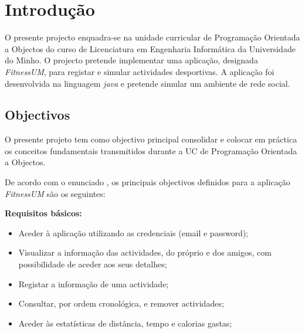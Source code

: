 \documentclass[a4paper,10pt]{report}
\begin{document}

\newpage
\phantom{placeholder} %
\thispagestyle{empty} %
\tableofcontents
\phantom{placeholder} %
\thispagestyle{empty} %
\newpage
\phantom{placeholder} %
\thispagestyle{empty} %
\pagestyle{fancy}
\setlength{\headheight}{15.2pt}
\fancyhf{} %
\fancyfoot[LE,RO]{\thepage}
\setcounter{page}{0}

\chapter{Introdução}
\label{cap:intro}
O presente projecto enquadra-se na unidade curricular de Programação Orientada a Objectos do curso de Licenciatura em Engenharia 
Informática da Universidade do Minho.
O projecto pretende implementar uma aplicação, designada \emph{FitnessUM}, para registar e simular actividades desportivas.
A aplicação foi desenvolvida na linguagem \emph{java} e pretende simular um ambiente de rede social.

\section{Objectivos}
\label{sec:obj}
O presente projeto tem como objectivo principal consolidar e colocar em práctica os conceitos fundamentais transmitidos durante a UC de 
Programação Orientada a Objectos.

De acordo com o enunciado \cite{enunciado}, os principais objectivos definidos para a aplicação \emph{FitnessUM} são os seguintes:

\textbf{Requisitos básicos:}
\begin{itemize}
\item Aceder à aplicação utilizando as credenciais (email e password);
\item Visualizar a informação das actividades, do próprio e dos amigos, com possibilidade de aceder aos seus detalhes; 
\item Registar a informação de uma actividade;
\item Consultar, por ordem cronológica, e remover actividades;  
\item Aceder às estatísticas de distância, tempo e calorias gastas;
\end{itemize}
\end{document}
